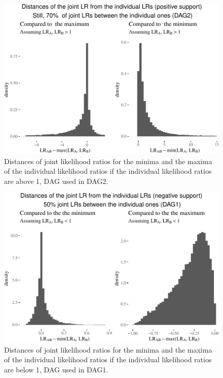 \documentclass[
  10pt,
  dvipsnames,enabledeprecatedfontcommands]{scrartcl}
\begin{document}
\begin{figure}


\begin{center}\includegraphics[width=0.7\linewidth]{conjunction-appendix14_files/figure-latex/unnamed-chunk-23-1} \end{center}

\caption{Distances of joint likelihood ratios for the minima and the maxima of the individual likelihood ratios if the individual likelihood ratios are above 1, DAG used in \textsf{DAG2}.}
\label{fig:LRabovePlotDep}
\end{figure}

\begin{figure}


\begin{center}\includegraphics[width=0.7\linewidth]{conjunction-appendix14_files/figure-latex/unnamed-chunk-24-1} \end{center}

\caption{Distances of joint likelihood ratios for the minima and the maxima of the individual likelihood ratios if the individual likelihood ratios are below 1, DAG used in \textsf{DAG1}.} 
\label{fig:LRlowerPlot}
\end{figure}
\end{document}
